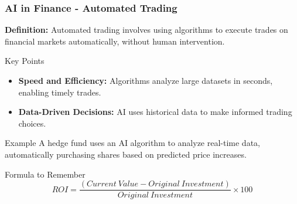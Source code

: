 \documentclass{beamer}
\begin{document}
\begin{frame}[fragile]
    \frametitle{AI in Finance - Automated Trading}

    \textbf{Definition:}  
    Automated trading involves using algorithms to execute trades on financial markets automatically, without human intervention.

    \begin{block}{Key Points}
        \begin{itemize}
            \item \textbf{Speed and Efficiency:} Algorithms analyze large datasets in seconds, enabling timely trades.
            \item \textbf{Data-Driven Decisions:} AI uses historical data to make informed trading choices.
        \end{itemize}
    \end{block}

    \begin{block}{Example}
        A hedge fund uses an AI algorithm to analyze real-time data, automatically purchasing shares based on predicted price increases.
    \end{block}

    \begin{block}{Formula to Remember}
        \begin{equation}
            ROI = \frac{(Current \ Value - Original \ Investment)}{Original \ Investment} \times 100
        \end{equation}
    \end{block}
\end{frame}
\end{document}
